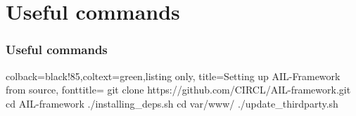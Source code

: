 
\begin{frame}[t,plain]
\end{frame}

\section{Useful commands}
\begin{frame}
\frametitle{Useful commands}

\begin{tcblisting}{colback=black!85,coltext=green,listing only, title=Setting up AIL-Framework from source, fonttitle=\bfseries}
git clone https://github.com/CIRCL/AIL-framework.git
cd AIL-framework
./installing_deps.sh
cd var/www/
./update_thirdparty.sh
\end{tcblisting}

%
%
%

\end{frame}
